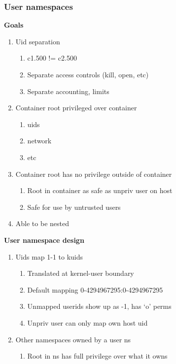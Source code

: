\documentclass{beamer}
\begin{document}
\begin{frame}[fragile]
\frametitle{User namespaces}
\textbf{Goals}
\begin{enumerate}
\item Uid separation
	\begin{enumerate}
	\item c1.500 != c2.500
	\item Separate access controls (kill, open, etc)
	\item Separate accounting, limits
	\end{enumerate}
\item Container root privileged over container
	\begin{enumerate}
	\item uids
	\item network
	\item etc
	\end{enumerate}
\item Container root has no privilege outside of container
	\begin{enumerate}
	\item Root in container as safe as unpriv user on host
	\item Safe for use by untrusted users
	\end{enumerate}
\item Able to be nested
\end{enumerate}
\end{frame}

\begin{frame}[fragile]
\textbf{User namespace design}
\begin{enumerate}
\item Uids map 1-1 to kuids
	\begin{enumerate}
	\item Translated at kernel-user boundary
	\item Default mapping 0-4294967295:0-4294967295
	\item Unmapped userids show up as -1, has `o' perms
	\item Unpriv user can only map own host uid
	\end{enumerate}
\item Other namespaces owned by a user ns
	\begin{enumerate}
	\item Root in ns has full privilege over what it owns
	\end{enumerate}
\end{enumerate}
\end{frame}
\end{document}
